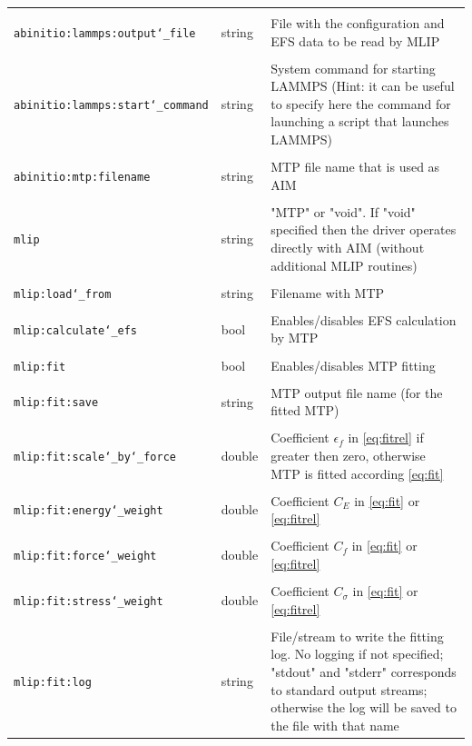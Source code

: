 \documentclass[12pt]{article}
\renewcommand{\_}{\char`_}
\begin{document}
{\begin{longtable}{| p{\largestoption} | p{3.5em} | p{\descriptionlength} |}
&&\\
		\texttt{abinitio:lammps:output\_file}& string &	File with the configuration and EFS data to be read by MLIP\\
&&\\
		\texttt{abinitio:lammps:start\_command}	& string & System command for starting LAMMPS (Hint: it can be useful to specify here the command for launching a script that launches LAMMPS)\\
&&\\
		\texttt{abinitio:mtp:filename} & string & MTP file name that is used as AIM\\
		\hline
&&\\
		\texttt{mlip}& string &	"MTP" or "void". If "void" specified then the driver operates directly with AIM (without additional MLIP routines)\\
&&\\
		\texttt{mlip:load\_from}& string &	Filename with MTP\\
&&\\
		\texttt{mlip:calculate\_efs}& bool &	Enables/disables EFS calculation by MTP\\
&&\\
		\texttt{mlip:fit}& bool &		Enables/disables MTP fitting\\
&&\\
		\texttt{mlip:fit:save} &string&	MTP output file name (for the fitted MTP)\\
&&\\
		\texttt{mlip:fit:scale\_by\_force}&	double&	Coefficient $\epsilon_f$ in \eqref{eq:fitrel} if greater then zero, otherwise MTP is fitted according \eqref{eq:fit}\\
&&\\
		\texttt{mlip:fit:energy\_weight}& double & Coefficient $C_E$ in \eqref{eq:fit} or \eqref{eq:fitrel}\\
&&\\
		\texttt{mlip:fit:force\_weight}	& double & Coefficient $C_f$ in \eqref{eq:fit} or \eqref{eq:fitrel} \\
&&\\
		\texttt{mlip:fit:stress\_weight}& double &  Coefficient $C_\sigma$ in \eqref{eq:fit} or \eqref{eq:fitrel}\\
&&\\
		\texttt{mlip:fit:log}	&string&	File/stream to write the fitting log.
		No logging if not specified; "stdout" and "stderr" corresponds to standard output streams; otherwise the log will be saved to the file with that name\\

\end{longtable}}
\end{document}
